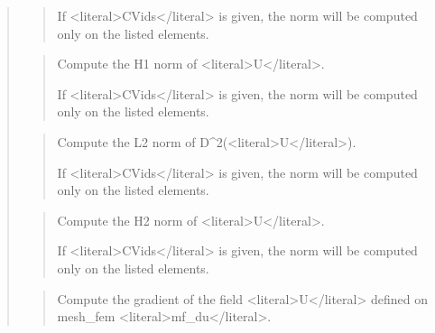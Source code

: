 \documentclass[a4paper,11pt,english]{sphinxmanual}
\begin{document}
\begin{quote}
\begin{quote}
\sphinxAtStartPar
If \textless{}literal\textgreater{}CVids\textless{}/literal\textgreater{} is given, the norm will be computed only on the listed
elements.
\end{quote}

\sphinxAtStartPar
{}
\begin{quote}

\sphinxAtStartPar
Compute the H1 norm of \textless{}literal\textgreater{}U\textless{}/literal\textgreater{}.

\sphinxAtStartPar
If \textless{}literal\textgreater{}CVids\textless{}/literal\textgreater{} is given, the norm will be computed only on the listed
elements.
\end{quote}

\sphinxAtStartPar
{}
\begin{quote}

\sphinxAtStartPar
Compute the L2 norm of D\textasciicircum{}2(\textless{}literal\textgreater{}U\textless{}/literal\textgreater{}).

\sphinxAtStartPar
If \textless{}literal\textgreater{}CVids\textless{}/literal\textgreater{} is given, the norm will be computed only on the listed
elements.
\end{quote}

\sphinxAtStartPar
{}
\begin{quote}

\sphinxAtStartPar
Compute the H2 norm of \textless{}literal\textgreater{}U\textless{}/literal\textgreater{}.

\sphinxAtStartPar
If \textless{}literal\textgreater{}CVids\textless{}/literal\textgreater{} is given, the norm will be computed only on the listed
elements.
\end{quote}

\sphinxAtStartPar
{}
\begin{quote}

\sphinxAtStartPar
Compute the gradient of the field \textless{}literal\textgreater{}U\textless{}/literal\textgreater{} defined on mesh\_fem \textless{}literal\textgreater{}mf\_du\textless{}/literal\textgreater{}.


\end{quote}
\end{quote}
\end{document}
